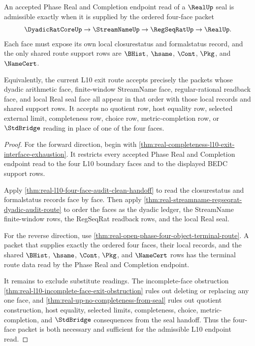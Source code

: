 \begin{theorem}
\label{thm:real-l10-four-face-exit-criterion}
An accepted Phase Real and Completion endpoint read of a $\RealUp$ seal is admissible exactly when it is supplied by the ordered four-face packet
$$
\DyadicRatCoreUp \to \StreamNameUp \to \RegSeqRatUp \to \RealUp.
$$
Each face must expose its own local closurestatus and formalstatus record, and the only shared route support rows are $\BHist$, $\hsame$, $\Cont$, $\Pkg$, and $\NameCert$.

Equivalently, the current L10 exit route accepts precisely the packets whose dyadic arithmetic face, finite-window StreamName face, regular-rational readback face, and local Real seal face all appear in that order with those local records and shared support rows. It accepts no quotient row, host equality row, selected external limit, completeness row, choice row, metric-completion row, or $\StdBridge$ reading in place of one of the four faces.
\end{theorem}
\begin{proof}
For the forward direction, begin with \autoref{thm:real-completeness-l10-exit-interface-exhaustion}. It restricts every accepted Phase Real and Completion endpoint read to the four L10 boundary faces and to the displayed BEDC support rows.

Apply \autoref{thm:real-l10-four-face-audit-clean-handoff} to read the closurestatus and formalstatus records face by face. Then apply \autoref{thm:real-streamname-regseqrat-dyadic-audit-route} to order the faces as the dyadic ledger, the StreamName finite-window rows, the RegSeqRat readback rows, and the local Real seal.

For the reverse direction, use \autoref{thm:real-open-phase-four-object-terminal-route}. A packet that supplies exactly the ordered four faces, their local records, and the shared $\BHist$, $\hsame$, $\Cont$, $\Pkg$, and $\NameCert$ rows has the terminal route data read by the Phase Real and Completion endpoint.

It remains to exclude substitute readings. The incomplete-face obstruction \autoref{thm:real-l10-incomplete-face-exit-obstruction} rules out deleting or replacing any one face, and \autoref{thm:real-up-no-completeness-from-seal} rules out quotient construction, host equality, selected limits, completeness, choice, metric-completion, and $\StdBridge$ consequences from the seal handoff. Thus the four-face packet is both necessary and sufficient for the admissible L10 endpoint read.
\end{proof}


